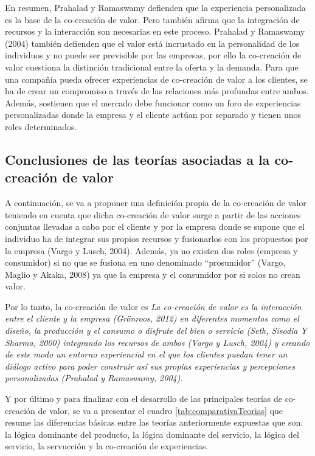 En resumen, Prahalad y Ramaswamy defienden que la experiencia personalizada es la base de la co-creación de valor. Pero también afirma que la integración de recursos y la interacción son necesarias en este proceso. Prahalad y Ramaswamy (2004) también defienden que el valor está incrustado en la personalidad de los individuos y no puede ser previsible por las empresas, por ello la co-creación de valor cuestiona la distinción tradicional entre la oferta y la demanda. Para que una compañía pueda ofrecer experiencias de co-creación de valor a los clientes, se ha de crear un compromiso a través de las relaciones más profundas entre ambos. Además, sostienen que el mercado debe funcionar como un foro de experiencias personalizadas donde la empresa y el cliente actúan por separado y tienen unos roles determinados. 

\subsection{Conclusiones de las teorías asociadas a la co-creación de valor}

A continuación, se va a proponer una definición propia de la co-creación de valor teniendo en cuenta que dicha co-creación de valor surge a partir de las acciones conjuntas llevadas a cabo por el cliente y por la empresa donde se supone que el individuo ha de integrar sus propios recursos y fusionarlos con los propuestos por la empresa (Vargo y Lusch, 2004). Además, ya no existen dos roles (empresa y consumidor) si no que se fusiona en uno denominado “prosumidor” (Vargo, Maglio y Akaka, 2008) ya que la empresa y el consumidor por si solos no crean valor. 

Por lo tanto, la co-creación de valor es \emph{La co-creación de valor es la interacción entre el cliente y la empresa (Grönroos, 2012) en diferentes momentos como el diseño, la producción y el consumo o disfrute del bien o servicio (Seth, Sisodia Y Sharma, 2000) integrando los recursos de ambos (Vargo y Lusch, 2004) y creando de este modo un entorno experiencial en el que los clientes puedan tener un diálogo activo para poder construir así sus propias experiencias y percepciones personalizadas (Prahalad y Ramaswamy, 2004).}

Y por último y para finalizar con el desarrollo de las principales teorías de co-creación de valor, se va a presentar el cuadro \ref{tab:comparativaTeorias} que resume las diferencias básicas entre las teorías anteriormente expuestas que son: la lógica dominante del producto, la lógica dominante del servicio, la lógica del servicio, la servucción y la co-creación de experiencias.


